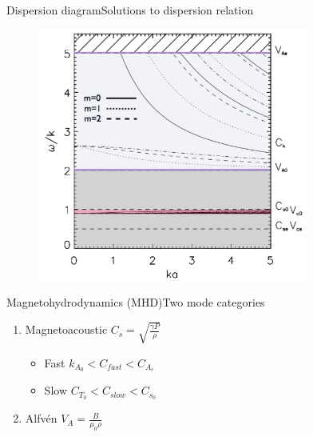 \documentclass[table]{beamer}
\begin{document}
\begin{frame}{Dispersion diagram}{Solutions to dispersion relation}
    \begin{figure}
        \includegraphics[width=3.5in]{disp_diagram.png}
    \end{figure}
\end{frame}%
\begin{frame}{Magnetohydrodynamics (MHD)}{Two mode categories}
        \begin{enumerate}
            \item \textcolor{bblue}{Magnetoacoustic}
                $C_s = \sqrt{\frac{\gamma P}{\rho}}$
                \begin{itemize}
                    \item Fast $k_{A_0} < C_{fast} < C_{A_e} $
                    \item Slow $C_{T_0} < C_{slow} < C_{s_0} $
                \end{itemize}
            \item \textcolor{bblue}{Alfv\'en}
                $V_A = \frac{B}{\mu_0\rho}$
        \end{enumerate}
\end{frame}%
\end{document}
